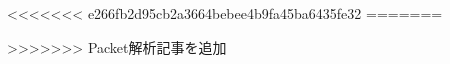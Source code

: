 \documentclass[papersize, b5paper, tombo, 11pt]{jsbook}
\begin{document}
\setcounter{page}{1}

\tableofcontents


<<<<<<< e266fb2d95cb2a3664bebee4b9fa45ba6435fe32
=======



>>>>>>> Packet解析記事を追加
\end{document}
